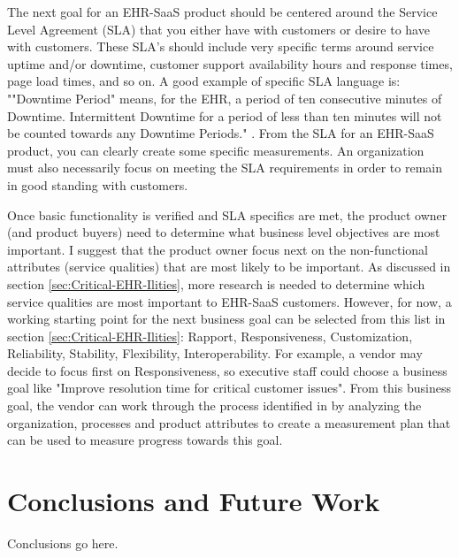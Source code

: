 \documentclass[10pt]{article}
\begin{document}
The next goal for an EHR-SaaS product should be centered around the Service Level Agreement (SLA) that you either have with customers or desire to have with customers.
These SLA's should include very specific terms around service uptime and/or downtime, customer support availability hours and response times, page load times, and so on.
A good example of specific SLA language is: ""Downtime Period" means, for the EHR, a period of ten consecutive minutes of Downtime. Intermittent Downtime for a period of less than ten minutes will not be counted towards any Downtime Periods." \cite{emr-sla-example}. 
From the SLA for an EHR-SaaS product, you can clearly create some specific measurements.
An organization must also necessarily focus on meeting the SLA requirements in order to remain in good standing with customers.

Once basic functionality is verified and SLA specifics are met, the product owner (and product buyers) need to determine what business level objectives are most important.
I suggest that the product owner focus next on the non-functional attributes (service qualities) that are most likely to be important.
As discussed in section \ref{sec:Critical-EHR-Ilities}, more research is needed to determine which service qualities are most important to EHR-SaaS customers.
However, for now, a working starting point for the next business goal can be selected from this list in section \ref{sec:Critical-EHR-Ilities}: Rapport, Responsiveness, Customization, Reliability, Stability, Flexibility, Interoperability.
For example, a vendor may decide to focus first on Responsiveness, so executive staff could choose a business goal like "Improve resolution time for critical customer issues".
From this business goal, the vendor can work through the process identified in \cite{sei-gqim} by analyzing the organization, processes and product attributes to create a measurement plan that can be used to measure progress towards this goal.



\section{Conclusions and Future Work}

Conclusions go here. 



\end{document}
